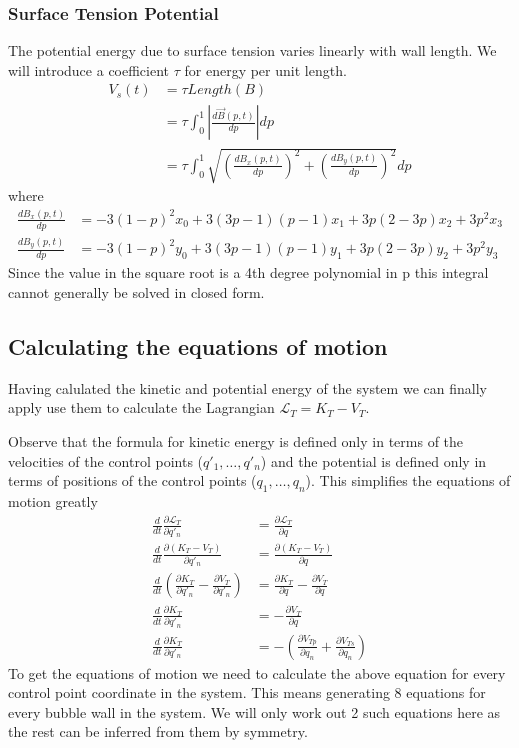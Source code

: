 \documentclass{article}
\begin{document}
\subsubsection{Surface Tension Potential}
The potential energy due to surface tension varies linearly with wall length. We
will introduce a coefficient $\tau$ for energy per unit length.
\begin{align*}
V_s(t)&=\tau Length(B)\\
&=\tau \int_0^1 \left|\frac{d \vec{B}(p,t)}{dp}\right| dp\\
&=\tau \int_0^1 \sqrt{\left(\frac{d B_x(p,t)}{dp}\right)^2+\left(\frac{d
B_y(p,t)}{dp}\right)^2} dp
\end{align*}
where
\begin{align*}
\frac{d B_x(p,t)}{dp}&= -3(1-p)^2x_0 +3(3p-1) (p-1)x_1+3p(2-3p)x_2 +3p^2x_3\\
\frac{d B_y(p,t)}{dp}&= -3(1-p)^2y_0 +3(3p-1) (p-1)y_1+3p(2-3p)y_2 +3p^2y_3
\end{align*}
Since the value in the square root is a 4th degree polynomial in p this
integral cannot generally be solved in closed form.
\subsection{Calculating the equations of motion}
Having calulated the kinetic and potential energy of the system we can finally
apply use them to calculate the Lagrangian $\mathcal{L}_T=K_T-V_T$.

Observe that the formula for kinetic energy is defined only in terms of
the velocities of the control points ($q'_1,\dots,q'_n$) and the potential is
defined only in terms of positions of the control points ($q_1,\dots,q_n$).
This simplifies the equations of motion greatly
\begin{align*}
\frac{d}{d t}\frac{\partial \mathcal{L}_T}{\partial q'_n} 
&=\frac{\partial \mathcal{L}_T}{\partial q} \\
\frac{d}{d t}\frac{\partial (K_T-V_T)}{\partial q'_n}
&= \frac{\partial (K_T-V_T)}{\partial q} \\
\frac{d}{d t}\left( \frac{\partial K_T}{\partial q'_n} - \frac{\partial
V_T}{\partial q'_n}\right)
&=\frac{\partial K_T}{\partial q}-\frac{\partial V_T}{\partial q} \\
\frac{d}{d t} \frac{\partial K_T}{\partial q'_n}
&=-\frac{\partial V_T}{\partial q}\\
\frac{d}{d t} \frac{\partial K_T}{\partial q'_n}
&= -\left(\frac{\partial V_{Tp}}{\partial q_n}+\frac{\partial V_{Ts}}{\partial
q_n}\right)
\end{align*}
To get the equations of motion we need to calculate the above equation for every
control point coordinate in the system. This means generating 8 equations for
every bubble wall in the system. We will only work out 2 such equations here as
the rest can be inferred from them by symmetry.
\end{document}
